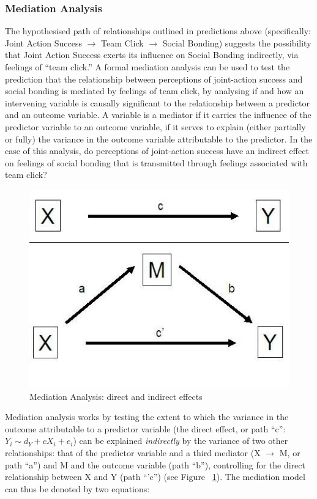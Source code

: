 {\subsubsection{Mediation Analysis}
The hypothesised path of relationships outlined in predictions above (specifically: Joint Action Success $\rightarrow$ Team Click $\rightarrow$ Social Bonding) suggests the possibility that Joint Action Success exerts its influence on Social Bonding indirectly, via feelings of ``team click.''  A formal mediation analysis can be used to test the prediction that the relationship between perceptions of joint-action success and social bonding is mediated by feelings of team click, by analysing if and how an intervening variable is causally significant to the relationship between a predictor and an outcome variable. A variable is a mediator if it carries the influence of the predictor variable to an outcome variable, if it serves to explain (either partially or fully) the variance in the outcome variable attributable to the predictor. In the case of this analysis, do perceptions of joint-action success have an indirect effect on feelings of social bonding that is transmitted through feelings associated with team click?

\begin{figure}[htbp]
  \begin{center}
    \includegraphics[scale = .5]{images/mediation_image.jpg}
    \caption{Mediation Analysis: direct and indirect effects}
    \label{fig:mediationAnalysis}
  \end{center}
\end{figure}

Mediation analysis works by testing the extent to which the variance in the outcome attributable to a predictor variable (the direct effect, or path ``c'': $Y_i \sim d_Y + cX_i + e_i$) can be explained \textit{indirectly} by the variance of two other relationships: that of the predictor variable and a third mediator (X $\rightarrow$ M, or path ``a'')  and M and the outcome variable (path ``b''), controlling for the direct relationship between X and Y (path ``'c'') (see Figure ~\ref{fig:mediationAnalysis}). The mediation model can thus be denoted by two equations:

}

